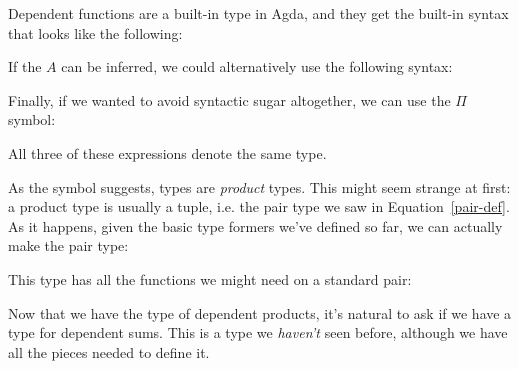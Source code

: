 Dependent functions are a built-in type in Agda, and they get the built-in
syntax that looks like the following:
\begin{agdalisting*}
\end{agdalisting*}
If the \(A\) can be inferred, we could alternatively use the following syntax:
\begin{agdalisting*}
\end{agdalisting*}
Finally, if we wanted to avoid syntactic sugar altogether, we can use the
\(\Pi\) symbol:
\begin{agdalisting*}
\end{agdalisting*}
All three of these expressions denote the same type.

As the symbol suggests, \AgdaFunction{\(\Pi\)} types are \emph{product} types.
This might seem strange at first: a product type is usually a tuple,
i.e. the pair type we saw in Equation~\ref{pair-def}.
As it happens, given the basic type formers we've defined so far, we can
actually make the pair type:
\begin{agdalisting*}
\end{agdalisting*}
This type has all the functions we might need on a standard pair:
\begin{multicols}{3}
  \begin{agdalisting*}
  \end{agdalisting*} \columnbreak
  \begin{agdalisting*}
  \end{agdalisting*} \columnbreak
  \begin{agdalisting*}
  \end{agdalisting*}
\end{multicols}

Now that we have the type of dependent products, it's natural to ask if we have
a type for dependent sums.
This is a type we \emph{haven't} seen before, although we have all the pieces
needed to define it.

